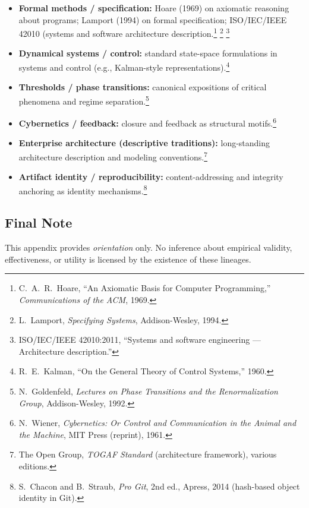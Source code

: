 \begin{itemize}
  \item \textbf{Formal methods / specification:}
  Hoare (1969) on axiomatic reasoning about programs;
  Lamport (1994) on formal specification; ISO/IEC/IEEE 42010 (systems and
  software architecture description.\footnote{C.\ A.\ R.\ Hoare,
  ``An Axiomatic Basis for Computer Programming,'' \emph{Communications of
  the ACM}, 1969.}
  \footnote{L.\ Lamport, \emph{Specifying Systems}, Addison-Wesley, 1994.}
  \footnote{ISO/IEC/IEEE 42010:2011, ``Systems and software engineering ---
  Architecture description.''}

  \item \textbf{Dynamical systems / control:}
  standard state-space formulations in systems and control
  (e.g., Kalman-style representations).\footnote{R.\ E.\ Kalman,
  ``On the General Theory of Control Systems,'' 1960.}

  \item \textbf{Thresholds / phase transitions:}
  canonical expositions of critical phenomena and regime separation.\footnote{
  N.\ Goldenfeld, \emph{Lectures on Phase Transitions and the Renormalization
  Group}, Addison-Wesley, 1992.}

  \item \textbf{Cybernetics / feedback:}
  closure and feedback as structural motifs.\footnote{
  N.\ Wiener, \emph{Cybernetics: Or Control and Communication in the Animal
  and the Machine}, MIT Press (reprint), 1961.}

  \item \textbf{Enterprise architecture (descriptive traditions):}
  long-standing architecture description and modeling conventions.\footnote{
  The Open Group, \emph{TOGAF Standard} (architecture framework), various
  editions.}

  \item \textbf{Artifact identity / reproducibility:}
  content-addressing and integrity anchoring as identity mechanisms.\footnote{
  S.\ Chacon and B.\ Straub, \emph{Pro Git}, 2nd ed., Apress, 2014
  (hash-based object identity in Git).}
\end{itemize}

\subsection*{Final Note}

This appendix provides \emph{orientation} only.
No inference about empirical validity, effectiveness, or utility is
licensed by the existence of these lineages.

